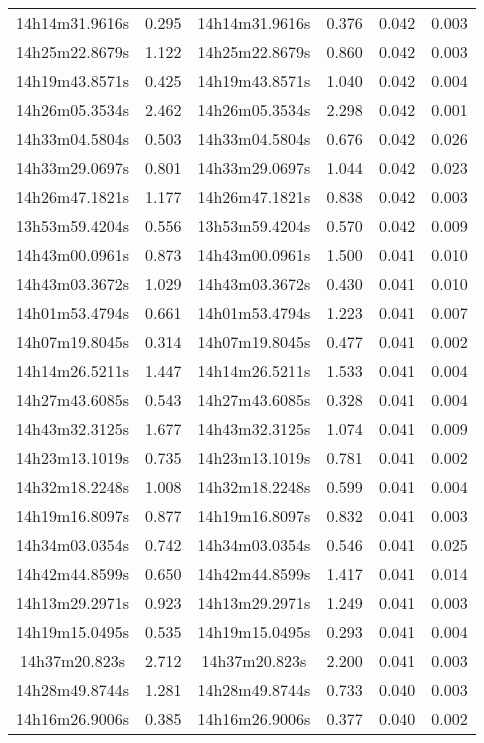 \begin{table}
\begin{tabular}{cccccc}
14h14m31.9616s & 0.295 & 14h14m31.9616s & 0.376 & 0.042 & 0.003 \\
14h25m22.8679s & 1.122 & 14h25m22.8679s & 0.860 & 0.042 & 0.003 \\
14h19m43.8571s & 0.425 & 14h19m43.8571s & 1.040 & 0.042 & 0.004 \\
14h26m05.3534s & 2.462 & 14h26m05.3534s & 2.298 & 0.042 & 0.001 \\
14h33m04.5804s & 0.503 & 14h33m04.5804s & 0.676 & 0.042 & 0.026 \\
14h33m29.0697s & 0.801 & 14h33m29.0697s & 1.044 & 0.042 & 0.023 \\
14h26m47.1821s & 1.177 & 14h26m47.1821s & 0.838 & 0.042 & 0.003 \\
13h53m59.4204s & 0.556 & 13h53m59.4204s & 0.570 & 0.042 & 0.009 \\
14h43m00.0961s & 0.873 & 14h43m00.0961s & 1.500 & 0.041 & 0.010 \\
14h43m03.3672s & 1.029 & 14h43m03.3672s & 0.430 & 0.041 & 0.010 \\
14h01m53.4794s & 0.661 & 14h01m53.4794s & 1.223 & 0.041 & 0.007 \\
14h07m19.8045s & 0.314 & 14h07m19.8045s & 0.477 & 0.041 & 0.002 \\
14h14m26.5211s & 1.447 & 14h14m26.5211s & 1.533 & 0.041 & 0.004 \\
14h27m43.6085s & 0.543 & 14h27m43.6085s & 0.328 & 0.041 & 0.004 \\
14h43m32.3125s & 1.677 & 14h43m32.3125s & 1.074 & 0.041 & 0.009 \\
14h23m13.1019s & 0.735 & 14h23m13.1019s & 0.781 & 0.041 & 0.002 \\
14h32m18.2248s & 1.008 & 14h32m18.2248s & 0.599 & 0.041 & 0.004 \\
14h19m16.8097s & 0.877 & 14h19m16.8097s & 0.832 & 0.041 & 0.003 \\
14h34m03.0354s & 0.742 & 14h34m03.0354s & 0.546 & 0.041 & 0.025 \\
14h42m44.8599s & 0.650 & 14h42m44.8599s & 1.417 & 0.041 & 0.014 \\
14h13m29.2971s & 0.923 & 14h13m29.2971s & 1.249 & 0.041 & 0.003 \\
14h19m15.0495s & 0.535 & 14h19m15.0495s & 0.293 & 0.041 & 0.004 \\
14h37m20.823s & 2.712 & 14h37m20.823s & 2.200 & 0.041 & 0.003 \\
14h28m49.8744s & 1.281 & 14h28m49.8744s & 0.733 & 0.040 & 0.003 \\
14h16m26.9006s & 0.385 & 14h16m26.9006s & 0.377 & 0.040 & 0.002 \\

\end{tabular}
\end{table}
